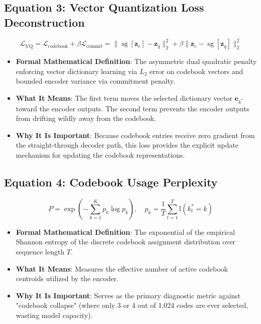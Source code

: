 \documentclass[11pt,a4paper]{article}
\theoremstyle{definition}
\begin{document}
\subsection{\textbf{Equation 3: Vector Quantization Loss Deconstruction}}
{\boldmath
\begin{equation}
\mathcal{L}_{\text{VQ}} = \mathcal{L}_{\text{codebook}} + \beta \mathcal{L}_{\text{commit}} = \|\operatorname{sg}[\mathbf{z}_e] - \mathbf{z}_q\|_2^2 + \beta \|\mathbf{z}_e - \operatorname{sg}[\mathbf{z}_q]\|_2^2
\end{equation}
}
\begin{itemize}
    \item \textbf{Formal Mathematical Definition}:
    The asymmetric dual quadratic penalty enforcing vector dictionary learning via $L_2$ error on codebook vectors and bounded encoder variance via commitment penalty.
    \item \textbf{What It Means}:
    The first term moves the selected dictionary vector $\mathbf{e}_{k^*}$ toward the encoder outputs. The second term prevents the encoder outputs from drifting wildly away from the codebook.
    \item \textbf{Why It Is Important}:
    Because codebook entries receive zero gradient from the straight-through decoder path, this loss provides the explicit update mechanism for updating the codebook representations.
\end{itemize}

\subsection{\textbf{Equation 4: Codebook Usage Perplexity}}
{\boldmath
\begin{equation}
P = \exp\left( -\sum_{k=1}^K p_k \log p_k \right), \quad p_k = \frac{1}{T} \sum_{t=1}^T \mathbb{I}(k^*_t = k)
\end{equation}
}
\begin{itemize}
    \item \textbf{Formal Mathematical Definition}:
    The exponential of the empirical Shannon entropy of the discrete codebook assignment distribution over sequence length $T$.
    \item \textbf{What It Means}:
    Measures the effective number of active codebook centroids utilized by the encoder.
    \item \textbf{Why It Is Important}:
    Serves as the primary diagnostic metric against "codebook collapse" (where only 3 or 4 out of 1,024 codes are ever selected, wasting model capacity).
\end{itemize}
\end{document}
